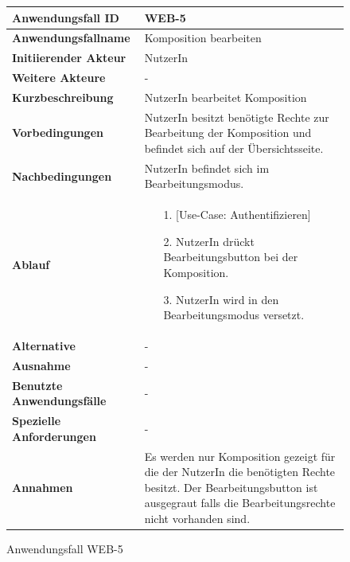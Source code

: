 \begin{figure}[h]
	\centering
	\begin{tabularx}{\textwidth}{ X | X }
		\textbf{Anwendungsfall ID} & WEB-5 \\ \hline
		\textbf{Anwendungsfallname} & Komposition bearbeiten \\ \hline
		\textbf{Initiierender Akteur} & NutzerIn \\ \hline
		\textbf{Weitere Akteure} & - \\ \hline
		\textbf{Kurzbeschreibung} & NutzerIn bearbeitet Komposition \\ \hline
		\textbf{Vorbedingungen} & NutzerIn besitzt benötigte Rechte zur Bearbeitung der Komposition und befindet sich auf der Übersichtsseite. \\ \hline
		\textbf{Nachbedingungen} & NutzerIn befindet sich im Bearbeitungsmodus. \\ \hline
		\textbf{Ablauf} &
		\begin{enumerate}
			\item[1.] [Use-Case: Authentifizieren]
			\item[2.] NutzerIn drückt Bearbeitungsbutton bei der Komposition.
			\item[3.] NutzerIn wird in den Bearbeitungsmodus versetzt.
		\end{enumerate} \\ \hline
		\textbf{Alternative} & - \\ \hline
		\textbf{Ausnahme} & - \\ \hline
		\textbf{Benutzte Anwendungsfälle} & - \\ \hline
		\textbf{Spezielle Anforderungen} & - \\ \hline
		\textbf{Annahmen} & Es werden nur Komposition gezeigt für die der NutzerIn die benötigten Rechte besitzt.
                  Der Bearbeitungsbutton ist ausgegraut falls die Bearbeitungsrechte nicht vorhanden sind.
	\end{tabularx}
	\caption{Anwendungsfall WEB-5}
	\label{fig:anwendungsfall-server-tabelle-web-5}
\end{figure}

